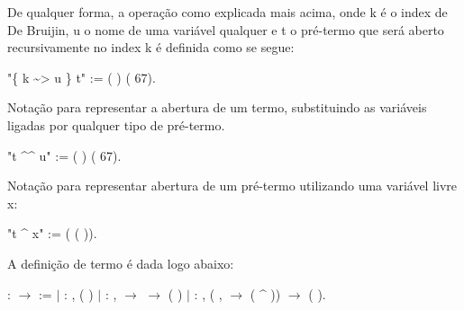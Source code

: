  De qualquer forma, a operação como explicada mais acima, onde k é o index de De Bruijin,
u o nome de uma variável qualquer e t o pré-termo que será aberto recursivamente no index k é 
definida como se segue:\begin{coqdoccode}
\coqdocemptyline
\coqdocnoindent
{} "\{ k \~{}> u \} t" := (   ) (  67).\coqdoceol
\coqdocemptyline
\coqdocemptyline
\end{coqdoccode}
Notação para representar a abertura de um termo, substituindo as variáveis ligadas
por qualquer tipo de pré-termo.\begin{coqdoccode}
\coqdocemptyline
\coqdocnoindent
{} "t \^{}\^{} u" := (  ) (  67).\coqdoceol
\coqdocemptyline
\end{coqdoccode}
Notação para representar abertura de um pré-termo utilizando uma variável livre
x:\begin{coqdoccode}
\coqdocemptyline
\coqdocnoindent
{} "t \^{} x" := (  ( )).\coqdoceol
\coqdocemptyline
\coqdocemptyline
\end{coqdoccode}
A definição de termo é dada logo abaixo:\begin{coqdoccode}
\coqdocemptyline
\coqdocnoindent
{}  :  \ensuremath{\rightarrow}  :=\coqdoceol
\coqdocindent{1.00em}
\ensuremath{|}  : \coqdockw{\ensuremath{\forall}} ,\coqdoceol
\coqdocindent{3.00em}
 ( )\coqdoceol
\coqdocindent{1.00em}
\ensuremath{|}  : \coqdockw{\ensuremath{\forall}}  ,\coqdoceol
\coqdocindent{3.00em}
  \ensuremath{\rightarrow} \coqdoceol
\coqdocindent{3.00em}
  \ensuremath{\rightarrow} \coqdoceol
\coqdocindent{3.00em}
 (  )\coqdoceol
\coqdocindent{1.00em}
\ensuremath{|}  : \coqdockw{\ensuremath{\forall}}  ,\coqdoceol
\coqdocindent{3.00em}
(\coqdockw{\ensuremath{\forall}} ,    \ensuremath{\rightarrow}  ( \^{} )) \ensuremath{\rightarrow}\coqdoceol
\coqdocindent{3.00em}
 ( ).\coqdoceol
\coqdocemptyline
\end{coqdoccode}
